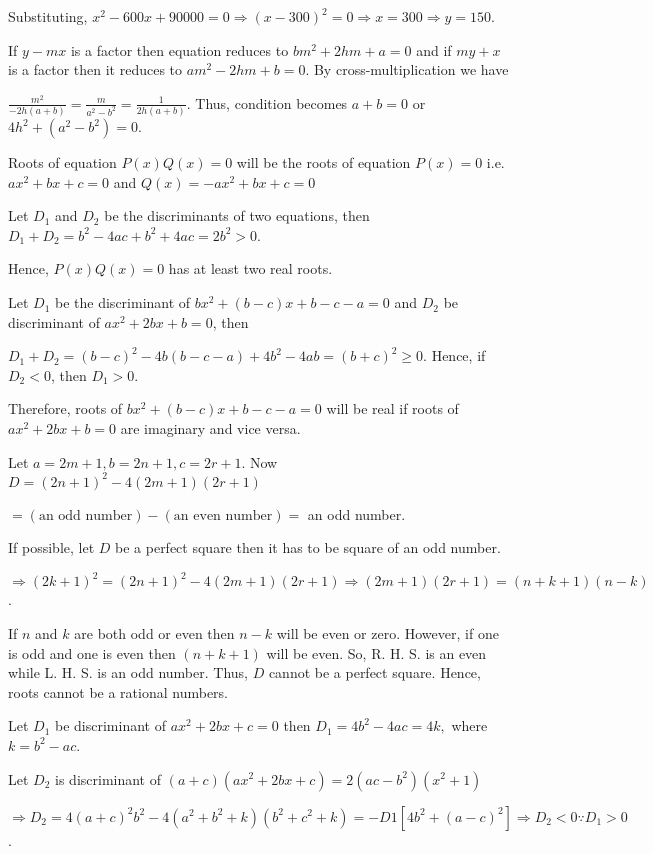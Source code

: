   Substituting, $x^2 - 600x + 90000 = 0\Rightarrow (x - 300)^2 = 0 \Rightarrow x = 300 \Rightarrow y = 150$.
\item If $y - mx$ is a factor then equation reduces to $bm^2 + 2hm + a = 0$ and if $my + x$ is a factor then
  it reduces to $am^2 - 2hm + b = 0$. By cross-multiplication we have

  $\frac{m^2}{-2h(a + b)} = \frac{m}{a^2 - b^2} = \frac{1}{2h(a + b)}$. Thus, condition becomes $a + b = 0$
  or $4h^2 + (a^2 - b^2) = 0$.
\item Roots of equation $P(x)Q(x) = 0$ will be the roots of equation $P(x) = 0$ i.e. $ax^2 + bx + c = 0$
  and $Q(x) = -ax^2 + bx + c = 0$

  Let $D_1$ and $D_2$ be the discriminants of two equations, then $D_1 + D_2 = b^2 - 4ac + b^2 + 4ac = 2b^2
  > 0$.

  Hence, $P(x)Q(x) = 0$ has at least two real roots.
\item Let $D_1$ be the discriminant of $bx^2 + (b - c)x + b - c - a = 0$ and $D_2$ be discriminant of
  $ax^2 + 2bx + b = 0$, then

  $D_1 + D_2 = (b - c)^2 - 4b(b - c - a) + 4b^2 - 4ab = (b + c)^2 \ge 0$. Hence, if $D_2 < 0$, then $D_1 >
  0$.

  Therefore, roots of $bx^2 + (b - c)x + b - c - a = 0$ will be real if roots of $ax^2 + 2bx + b = 0$ are
  imaginary and vice versa.
\item Let $a = 2m + 1, b = 2n + 1, c = 2r + 1$. Now $D = (2n + 1)^2 - 4(2m + 1)(2r + 1)$

  $= (\text{an odd number}) - (\text{an even number}) =$ an odd number.

  If possible, let $D$ be a perfect square then it has to be square of an odd number.

  $\Rightarrow (2k + 1)^2 = (2n + 1)^2 - 4(2m + 1)(2r + 1)\Rightarrow (2m + 1)(2r + 1) = (n + k + 1)(n - k)$.

  If $n$ and $k$ are both odd or even then $n - k$ will be even or zero. However, if one is odd and
  one is even then $(n + k + 1)$ will be even. So, R. H. S. is an even while L. H. S. is an odd number. Thus,
  $D$ cannot be a perfect square. Hence, roots cannot be a rational numbers.
\item Let $D_1$ be discriminant of $ax^2 + 2bx + c = 0$ then $D_1 = 4b^2 - 4ac = 4k,$ where $k = b^2 - ac$.

  Let $D_2$ is discriminant of $(a + c)(ax^2 + 2bx + c) = 2(ac - b^2)(x^2 + 1)$

  $\Rightarrow D_2 = 4(a + c)^2b^2 - 4(a^2 + b^2 + k)(b^2 + c^2 + k) = -D1[4b^2 + (a - c)^2] \Rightarrow D_2
  < 0 \because D_1 > 0$.

